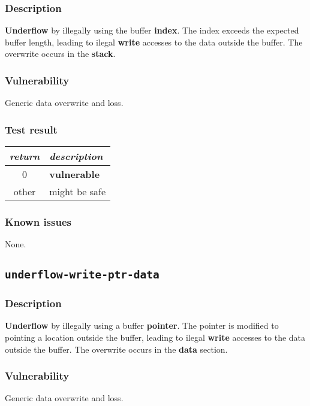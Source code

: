 \documentclass[a4paper]{book}
\begin{document}
\subsubsection{Description}

\textbf{Underflow} by illegally using the buffer \textbf{index}.
The index exceeds the expected buffer length,
leading to ilegal \textbf{write} accesses to the data outside the buffer.
The overwrite occurs in the \textbf{stack}.

\subsubsection{Vulnerability}
Generic data overwrite and loss.

\subsubsection{Test result}
\begin{tabular}{cl}
  \toprule
  \emph{return}  & \emph{description} \\
  \midrule
  0              & \textbf{vulnerable} \\
  other          & might be safe \\
  \bottomrule
\end{tabular}

\subsubsection{Known issues}

None.

\newpage

\subsection{\texttt{underflow-write-ptr-data}}\label{test-underflow-write-ptr-data}

\subsubsection{Description}

\textbf{Underflow} by illegally using a buffer \textbf{pointer}.
The pointer is modified to pointing a location outside the buffer,
leading to ilegal \textbf{write} accesses to the data outside the buffer.
The overwrite occurs in the \textbf{data} section.

\subsubsection{Vulnerability}
Generic data overwrite and loss.
\end{document}
